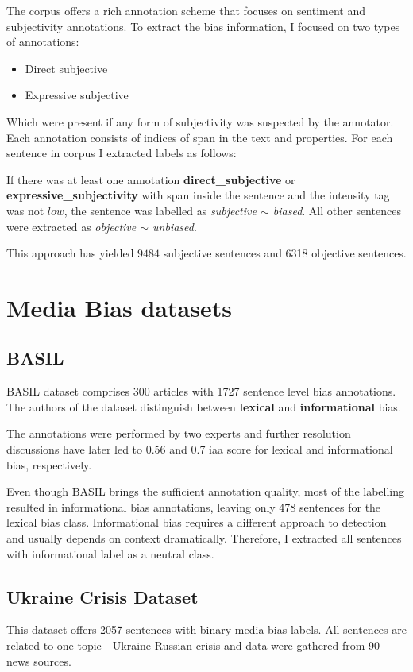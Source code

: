 The corpus offers a rich annotation scheme \cite{wiebe2005annotating} that focuses on sentiment and subjectivity annotations.
\newpage
To extract the bias information, I focused on two types of annotations:
\begin{itemize}
    \item Direct subjective
    \item Expressive subjective
\end{itemize}
Which were present if any form of subjectivity was suspected by the annotator. Each annotation consists of indices of span in the text and properties. For each sentence in corpus I extracted labels as follows:

If there was at least one annotation \textbf{direct\_subjective} or \textbf{expressive\_subjectivity} with span inside the sentence and the intensity tag was not $low$, the sentence was labelled as \textit{subjective $\sim$ biased}. All other sentences were extracted as \textit{objective $\sim$ unbiased}.

This approach has yielded $9484$ subjective sentences and 6318 objective sentences.


\section{Media Bias datasets}


\subsection{BASIL}
BASIL dataset \cite{fan2019plain} comprises 300 articles with 1727 sentence level bias annotations. The authors of the dataset distinguish between \textbf{lexical} and \textbf{informational} bias.

The annotations were performed by two experts and further resolution discussions have later led to 0.56 and 0.7 \Gls{iaa} score for lexical and informational bias, respectively.

Even though BASIL brings the sufficient annotation quality, most of the labelling resulted in informational bias annotations, leaving only 478 sentences for the lexical bias class. Informational bias requires a different approach to detection \cite{van2020context} and usually depends on context dramatically. Therefore, I extracted all sentences with informational label as a neutral class.




\subsection{Ukraine Crisis Dataset}
This dataset \cite{farber2020multidimensional} offers 2057 sentences with binary media bias labels. All sentences are related to one topic - Ukraine-Russian crisis and data were gathered from 90 news sources.

